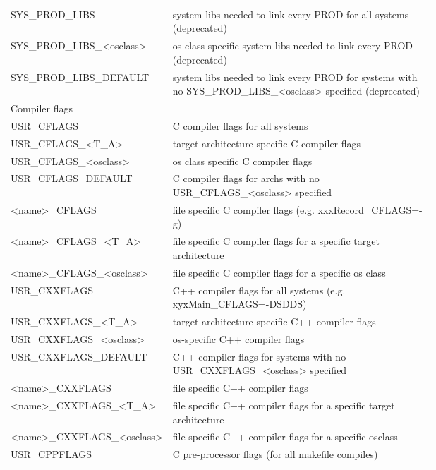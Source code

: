 \begin{center}
\begin{longtable}{lp{0.7\linewidth}}
SYS\_PROD\_LIBS & system libs needed to link every PROD for all systems (deprecated)\\
SYS\_PROD\_LIBS\_\textless{}osclass\textgreater{} & os class specific system libs needed to link every PROD (deprecated)\\
SYS\_PROD\_LIBS\_DEFAULT & system libs needed to link every PROD for systems with no SYS\_PROD\_LIBS\_\textless{}osclass\textgreater{} specified (deprecated)\\
Compiler flags & \\
USR\_CFLAGS & C compiler flags for all systems\\
USR\_CFLAGS\_\textless{}T\_A\textgreater{} & target architecture specific C compiler flags\\
USR\_CFLAGS\_\textless{}osclass\textgreater{} & os class specific C compiler flags\\
USR\_CFLAGS\_DEFAULT & C compiler flags for archs with no USR\_CFLAGS\_\textless{}osclass\textgreater{} specified\\
\textless{}name\textgreater{}\_CFLAGS & file specific C compiler flags (e.g. xxxRecord\_CFLAGS=-g)\\
\textless{}name\textgreater{}\_CFLAGS\_\textless{}T\_A\textgreater{} & file specific C compiler flags for a specific target architecture\\
\textless{}name\textgreater{}\_CFLAGS\_\textless{}osclass\textgreater{} & file specific C compiler flags for a specific os class\\
USR\_CXXFLAGS & C++ compiler flags for all systems (e.g. xyxMain\_CFLAGS=-DSDDS)\\
USR\_CXXFLAGS\_\textless{}T\_A\textgreater{} & target architecture specific C++ compiler flags\\
USR\_CXXFLAGS\_\textless{}osclass\textgreater{} & os-specific C++ compiler flags\\
USR\_CXXFLAGS\_DEFAULT & C++ compiler flags for systems with no USR\_CXXFLAGS\_\textless{}osclass\textgreater{} specified\\
\textless{}name\textgreater{}\_CXXFLAGS & file specific C++ compiler flags\\
\textless{}name\textgreater{}\_CXXFLAGS\_\textless{}T\_A\textgreater{} & file specific C++ compiler flags for a specific target architecture\\
\textless{}name\textgreater{}\_CXXFLAGS\_\textless{}osclass\textgreater{} & file specific C++ compiler flags for a specific osclass\\
USR\_CPPFLAGS & C pre-processor flags (for all makefile compiles)\\

\end{longtable}
\end{center}
